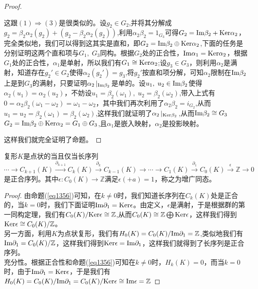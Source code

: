 \begin{proof}
\begin{enumerate}
    这跟$(1)\Rightarrow (3)$是很类似的。设$g_{2}\in G_{2}$,并将其分解成$g_{2}=\beta_{2}\alpha_{2}(g_{2})+(g_{2}-\beta_{2}\alpha_{2}(g_{2}))$,利用$\alpha_{2}\beta_{2}=1_{G_{3}}$可得$G_{2}={\rm Im}\beta_{2}+{\rm Ker}\alpha_{2}$，完全类似地，我们可以得到这其实是直和，即$G_{2}={\rm Im}\beta_{2}\oplus{\rm Ker}\alpha_{2}$,下面的任务是分别证明这两个直和项与$G_{1},\;G_{3}$同构。根据$G_{2}$处的正合性，${\rm Im}\alpha_{1}={\rm Ker}\alpha_{2}$，根据$G_{1}$处的正合性，$\alpha_{1}$是单射，所以我们有$G_{1}\cong {\rm Ker}\alpha_{2}$;设$g_{3}\in G_{3}$，则利用$\alpha_{2}$是满射，知道存在$g_{2}'\in G_{2}$使得$\alpha_{2}(g_{2}')=g_{3}$,将$g_{2}'$按直和项分解，可知$\alpha_{2}$限制在${\rm Im}\beta_{2}$上是到$G_{3}$的满射，只要证明$\alpha_{2}\left|_{{\rm Im}\beta_{2}}\right.$是单的。设$u_{1},\;u_{2}\in{\rm Im}\beta_{2}$使得$\alpha_{2}(u_{1})=\alpha_{2}(u_{2})$，不妨设$u_{1}=\beta_{2}(\omega_{1}),\;u_{2}=\beta_{2}(\omega_{2})$,带入上式有$0=\alpha_{2}\beta_{2}(\omega_{1}-\omega_{2})=\omega_{1}-\omega_{2}$，其中我们再次利用了$\alpha_{2}\beta_{2}=i_{G_{2}}$,从而$u_{1}=u_{2}=\beta_{2}(\omega_{1})=\beta_{2}(\omega_{2})$,这样我们就证明了$\alpha_{2}\left|_{{\rm Ker}\beta_{2}}\right.$,从而${\rm Im}\beta_{2}\cong G_{3}$ $G_{2}={\rm Im}\beta_{2}\oplus{\rm Ker}\alpha_{2}=G_{1}\oplus G_{3}$,且$\alpha_{1}$是嵌入映射，$\alpha_{2}$是投影映射。
\end{enumerate}
这样我们就完全证明了命题。
\end{proof}
\begin{proposition}\label{pro1395}
复形$K$是点状的当且仅当长序列
\begin{equation*}
    \cdots \rightarrow C_{k+1}(K)\xrightarrow{\partial_{k+1}}C_{k}(K)\xrightarrow{\partial_{k}}C_{k-1}(K)\rightarrow\cdots\rightarrow C_{1}(K)\xrightarrow{\partial_{1}}C_{0}(K)\xrightarrow{\epsilon}\mathbb{Z}\rightarrow 0
\end{equation*}
是正合序列。其中$\epsilon:C_{0}(K)\rightarrow\mathbb{Z}$满足$\epsilon(+a)=1$，称之为增广同态。
\end{proposition}
\begin{proof}
由命题(\ref{eq1356})可知，在$k\neq0$时，我们知道长序列在$C_{k}(K)$处是正合的，当$k=0$时，我们下面证明${\rm Im} \partial_{1}={\rm Ker} \epsilon$。由定义，$\epsilon$是满射，于是根据群的第一同构定理，我们有$C_{0}(K)/{\rm Ker} \epsilon\cong \mathbb{Z}$,从而$C_{0}(K)\cong \mathbb{Z}\bigoplus {\rm Ker}\epsilon$，这样我们得到${\rm Ker} \epsilon\cong C_{0}(K)/\mathbb{Z}$。\\
另一方面，利用$K$为点状复形，我们有$H_{0}(K)=C_{0}(K)/{\rm Im} \partial_{1}=\mathbb{Z}$,类似地我们有${\rm Im}\partial_{1}=C_{0}(K)/\mathbb{Z}$，这样我们得到${\rm Ker}\epsilon={\rm Im}\partial_{1}$，这样我们就得到了长序列是正合序列。\\
充分性。根据正合性和命题(\ref{eq1356})可知在$k\neq0$时，$H_{k}(K)=0$，而当$k=0$时，由于${\rm Im}\partial_{1}={\rm Ker}\epsilon$，于是我们有$H_{0}(K)=C_{0}(K)/{\rm Im}\partial_{1}=C_{0}(K)/{\rm Ker}\epsilon\cong{\rm Im}\epsilon=\mathbb{Z}$
\end{proof}
